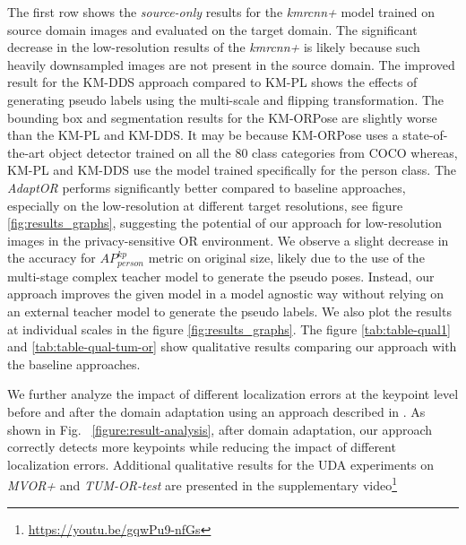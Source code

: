 The first row shows the \emph{source-only} results for the \emph{kmrcnn+} model trained on source domain images and evaluated on the target domain. The significant decrease in the low-resolution results of the  \emph{kmrcnn+} is likely because such heavily downsampled images are not present in the source domain. The improved result for the KM-DDS approach compared to KM-PL shows the effects of generating pseudo labels using the multi-scale and flipping transformation. The bounding box and segmentation results for the KM-ORPose are slightly worse than the KM-PL and KM-DDS. It may be because KM-ORPose uses a state-of-the-art object detector trained on all the 80 class categories from COCO whereas, KM-PL and KM-DDS use the model trained specifically for the person class. The \emph{AdaptOR} performs significantly better compared to baseline approaches, especially on the low-resolution at different target resolutions, see figure \ref{fig:results_graphs}, suggesting the potential of our approach for low-resolution images in the privacy-sensitive OR environment. We observe a slight decrease in the accuracy for \emph{$AP_{person}^{kp}$} metric on original size, likely due to the use of the multi-stage complex teacher model to generate the pseudo poses. Instead, our approach improves the given model in a model agnostic way without relying on an external teacher model to generate the pseudo labels. We also plot the results at individual scales in the figure \ref{fig:results_graphs}. The figure \ref{tab:table-qual1} and \ref{tab:table-qual-tum-or} show qualitative results comparing our approach with the baseline approaches. 

{\blue We further analyze the impact of different localization errors at the keypoint level before and after the domain adaptation using an approach described in \citep{ruggero2017benchmarking}. As shown in Fig. ~\ref{figure:result-analysis}, after domain adaptation, our approach correctly detects more keypoints while reducing the impact of different localization errors.} Additional qualitative results for the UDA experiments on \emph{MVOR+} and \emph{TUM-OR-test} are presented in the supplementary video\footnote{\url{https://youtu.be/gqwPu9-nfGs}}


